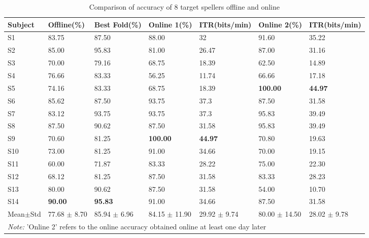 \begin{table}[h]
\small
\caption{Comparison of accuracy of 8 target spellers offline and online}
\label{tab:eight-target-comparison}
\begin{tabular}{@{}p{1.8cm}p{2cm}p{2cm}p{2.2cm}p{2cm}p{2.2cm}p{2cm}@{}}
\toprule
Subject & Offline(\%) & Best Fold(\%) & Online 1(\%) & ITR(bits/min) & Online 2(\%) & ITR(bits/min) \\ \midrule
S1      & 83.75       & 87.50        & 88.00        & 32             & 91.60        & 35.22 \\
S2      & 85.00       & 95.83        & 81.00        & 26.47          & 87.00        & 31.16 \\
S3      & 70.00       & 79.16        & 68.75        & 18.39          & 62.50        & 14.89 \\
S4      & 76.66       & 83.33        & 56.25        & 11.74          & 66.66        & 17.18 \\
S5      & 74.16       & 83.33        & 68.75        & 18.39          & \textbf{100.00}       & \textbf{44.97} \\
S6      & 85.62       & 87.50        & 93.75        & 37.3           & 87.50        & 31.58 \\
S7      & 83.12       & 93.75        & 93.75        & 37.3           & 95.83        & 39.49 \\
S8      & 87.50       & 90.62        & 87.50        & 31.58          & 95.83        & 39.49 \\
S9      & 70.60       & 81.25        & \textbf{100.00}       & \textbf{44.97}          & 70.80        & 19.63 \\
S10     & 73.00       & 81.25        & 91.00        & 34.66          & 70.00        & 19.15 \\
S11     & 60.00       & 71.87        & 83.33        & 28.22          & 75.00        & 22.30 \\
S12     & 68.12       & 81.25        & 87.50        & 31.58          & 83.33        & 28.23 \\
S13     & 80.00       & 90.62        & 87.50        & 31.58          & 54.00        & 10.70 \\
S14     & \textbf{90.00}       & \textbf{95.83}        & 91.00        & 34.66          & 87.50        & 31.58 \\ \midrule
Mean$\pm$Std & 77.68 $\pm$ 8.70 & 85.94 $\pm$ 6.96 & 84.15 $\pm$ 11.90 & 29.92 $\pm$ 9.74 & 80.00 $\pm$ 14.50 & 28.02 $\pm$ 9.78 \\ \bottomrule

\multicolumn{7}{l}{\footnotesize\textit{Note:} 'Online 2' refers to the online accuracy obtained online at least one day later}
\end{tabular}
\end{table}





